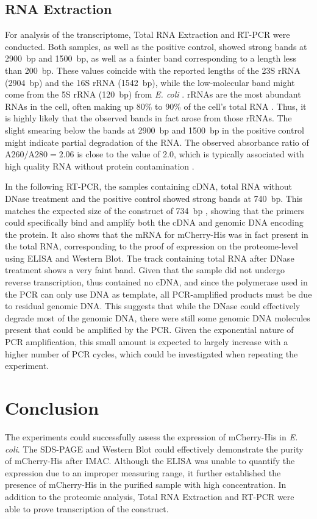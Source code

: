 \documentclass[a4paper,12pt]{article}
\begin{document}
\subsection{RNA Extraction}
For analysis of the transcriptome, Total RNA Extraction and RT-PCR were conducted. Both samples, as well as the positive control, showed strong bands at 2900~bp and 1500~bp, as well as a fainter band corresponding to a length less than 200~bp. These values coincide with the reported lengths of the 23S rRNA (2904~bp) and the 16S rRNA (1542~bp), while the low-molecular band might come from the 5S rRNA (120~bp) from \emph{E. coli} \cite{Kaczanowska2007}. rRNAs are the most abundant RNAs in the cell, often making up 80\% to 90\% of the cell's total RNA \cite{Munafo2016}. Thus, it is highly likely that the observed bands in fact arose from those rRNAs. The slight smearing below the bands at 2900~bp and 1500~bp in the positive control might indicate partial degradation of the RNA. The observed absorbance ratio of $\text{A260}/\text{A280}=2.06$ is close to the value of 2.0, which is typically associated with high quality RNA without protein contamination \cite{poovakka2018quality}. 

In the following RT-PCR, the samples containing cDNA, total RNA without DNase treatment and the positive control showed strong bands at 740~bp. This matches the expected size of the construct of 734~bp \cite{Schillberg2025}, showing that the primers could specifically bind and amplify both the cDNA and genomic DNA encoding the protein. It also shows that the mRNA for mCherry-His was in fact present in the total RNA, corresponding to the proof of expression on the proteome-level using ELISA and Western Blot. The track containing total RNA after DNase treatment shows a very faint band. Given that the sample did not undergo reverse transcription, thus contained no cDNA, and since the polymerase used in the PCR can only use DNA as template, all PCR-amplified products must be due to residual genomic DNA. This suggests that while the DNase could effectively degrade most of the genomic DNA, there were still some genomic DNA molecules present that could be amplified by the PCR. Given the exponential nature of PCR amplification, this small amount is expected to largely increase with a higher number of PCR cycles, which could be investigated when repeating the experiment.

\section{Conclusion}
The experiments could successfully assess the expression of mCherry-His in \emph{E. coli}. The SDS-PAGE and Western Blot could effectively demonstrate the purity of mCherry-His after IMAC. Although the ELISA was unable to quantify the expression due to an improper measuring range, it further established the presence of mCherry-His in the purified sample with high concentration. In addition to the proteomic analysis, Total RNA Extraction and RT-PCR were able to prove transcription of the construct. 
\end{document}

